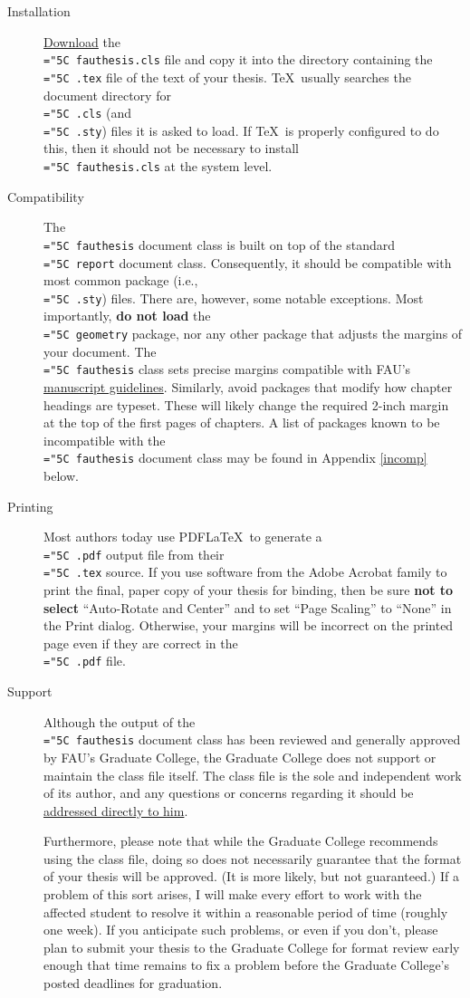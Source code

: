 \documentclass[11pt]{article}
\newcommand\guide{{http://www.fau.edu/graduate/forms-and-procedures/degree-completion/thesis-and-dissertation/index.php}}
\newcommand\home{{http://physics.fau.edu/\~cbeetle/FAUThesis/}}
\newcommand\code[1]{{\normalfont\texttt{\let\dv\textsl\chardef\\="5C #1}}}
\begin{document}
\begin{description}

\item[Installation]
\href\home{Download} the \code{fauthesis.cls} file and copy it into the directory containing the \code{.tex} file of the text of your thesis.  \TeX\ usually searches the document directory for \code{.cls} (and \code{.sty}) files it is asked to load.  If \TeX\ is properly configured to do this, then it should not be necessary to install \code{fauthesis.cls} at the system level.

\item[Compatibility]
The \code{fauthesis} document class is built on top of the standard \LaTeXe\ \code{report} document class.  Consequently, it should be compatible with most common package (i.e., \code{.sty}) files.  There are, however, some notable exceptions.  Most importantly, \textbf{do not load} the \code{geometry}  package, nor any other package that adjusts the margins of your document.  The \code{fauthesis} class sets precise margins compatible with FAU's 
\href\guide{manuscript guidelines}.
Similarly, avoid packages that modify how chapter headings are typeset.  These will likely change the required 2-inch margin at the top of the first pages of chapters.  A list of packages known to be incompatible with the \code{fauthesis} document class may be found in Appendix \ref{incomp} below.

\item[Printing]
Most authors today use PDF\LaTeX\ to generate a \code{.pdf} output file from their \code{.tex} source.  If you use software from the Adobe Acrobat family to print the final, paper copy of your thesis for binding, then be sure \textbf{not to select} ``Auto-Rotate and Center'' and to set ``Page Scaling'' to ``None'' in the Print dialog.  Otherwise, your margins will be incorrect on the printed page even if they are correct in the \code{.pdf} file.

\item[Support]
Although the output of the \code{fauthesis} document class has been reviewed and generally approved by FAU's Graduate College, the Graduate College does not support or maintain the class file itself.  The class file is the sole and independent work of its author, and any questions or concerns regarding it should be \href{mailto:cbeetle@physics.fau.edu}{addressed directly to him}.

Furthermore, please note that while the Graduate College recommends using the class file, doing so does not necessarily guarantee that the format of your thesis will be approved.  (It is more likely, but not guaranteed.)  If a problem of this sort arises, I will make every effort to work with the affected student to resolve it within a reasonable period of time (roughly one week).  If you anticipate such problems, or even if you don't, please plan to submit your thesis to the Graduate College for format review early enough that time remains to fix a problem before the Graduate College's posted deadlines for graduation.


\end{description}
\end{document}
